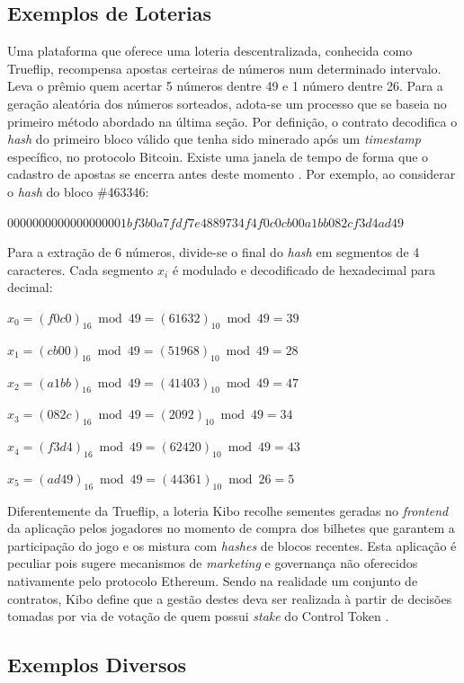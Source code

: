 \documentclass[a4paper,12pt]{monografia}
\theoremstyle{plain}
\theoremstyle{definition}
\theoremstyle{remark}
\begin{document}
\subsection{Exemplos de Loterias}
Uma plataforma que oferece uma loteria descentralizada, conhecida como Trueflip, recompensa apostas certeiras de n\'{u}meros num determinado intervalo.
Leva o pr\^{e}mio quem acertar 5 n\'{u}meros dentre 49 e 1 n\'{u}mero dentre 26.
Para a gera\c{c}\~{a}o aleat\'{o}ria dos n\'{u}meros sorteados, adota-se um processo que se baseia no primeiro m\'{e}todo abordado na \'{u}ltima se\c{c}\~{a}o.
Por defini\c{c}\~{a}o, o contrato decodifica o \textit{hash} do primeiro bloco v\'{a}lido que tenha sido minerado ap\'{o}s um \textit{timestamp} espec\'{i}fico, no protocolo Bitcoin.
Existe uma janela de tempo de forma que o cadastro de apostas se encerra antes deste momento \cite{trueflip}.
Por exemplo, ao considerar o \textit{hash} do bloco \#463346:

$0000000000000000001bf3b0a7fdf7e4889734f4f0c0cb00a1bb082cf3d4ad49$

Para a extra\c{c}\~{a}o de 6 n\'{u}meros, divide-se o final do \textit{hash} em segmentos de 4 caracteres.
Cada segmento $x_i$ \'{e} modulado e decodificado de hexadecimal para decimal:

$x_0=(f0c0)_{16} \bmod 49=(61632)_{10} \bmod 49=39$

$x_1=(cb00)_{16} \bmod 49=(51968)_{10} \bmod 49=28$

$x_2=(a1bb)_{16} \bmod 49=(41403)_{10} \bmod 49=47$

$x_3=(082c)_{16} \bmod 49=(2092)_{10} \bmod 49=34$

$x_4=(f3d4)_{16} \bmod 49=(62420)_{10} \bmod 49=43$

$x_5=(ad49)_{16} \bmod 49=(44361)_{10} \bmod 26=5$

Diferentemente da Trueflip, a loteria Kibo recolhe sementes geradas no \textit{frontend} da aplica\c{c}\~{a}o pelos jogadores no momento de compra dos bilhetes que garantem a participa\c{c}\~{a}o do jogo e os mistura com \textit{hashes} de blocos recentes.
Esta aplica\c{c}\~{a}o \'{e} peculiar pois sugere mecanismos de \textit{marketing} e governan\c{c}a n\~{a}o oferecidos nativamente pelo protocolo Ethereum.
Sendo na realidade um conjunto de contratos, Kibo define que a gest\~{a}o destes deva ser realizada \`{a} partir de decis\~{o}es tomadas por via de vota\c{c}\~{a}o de quem possui \textit{stake} do Control Token \cite{kibo}.

\subsection{Exemplos Diversos}
\end{document}
